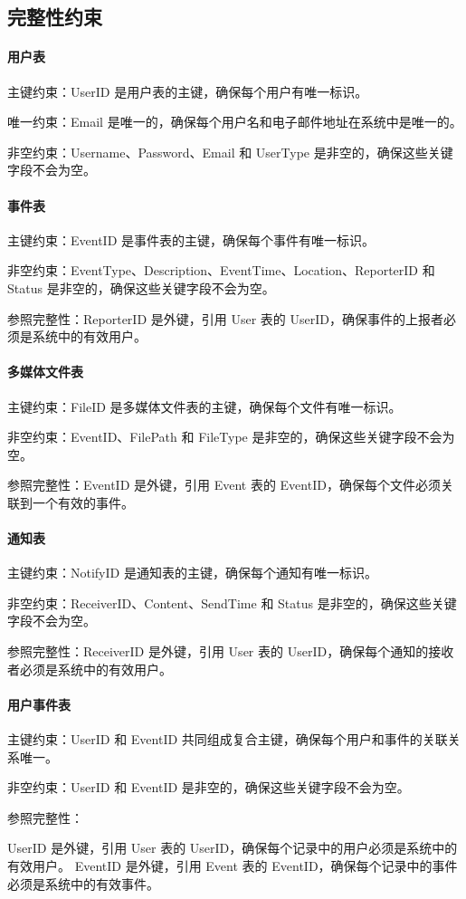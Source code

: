 \subsection{完整性约束}

\paragraph{用户表}

主键约束：UserID 是用户表的主键，确保每个用户有唯一标识。

唯一约束：Email 是唯一的，确保每个用户名和电子邮件地址在系统中是唯一的。

非空约束：Username、Password、Email 和 UserType 是非空的，确保这些关键字段不会为空。

\paragraph{事件表}

主键约束：EventID 是事件表的主键，确保每个事件有唯一标识。

非空约束：EventType、Description、EventTime、Location、ReporterID 和 Status 是非空的，确保这些关键字段不会为空。

参照完整性：ReporterID 是外键，引用 User 表的 UserID，确保事件的上报者必须是系统中的有效用户。

\paragraph{多媒体文件表}

主键约束：FileID 是多媒体文件表的主键，确保每个文件有唯一标识。

非空约束：EventID、FilePath 和 FileType 是非空的，确保这些关键字段不会为空。

参照完整性：EventID 是外键，引用 Event 表的 EventID，确保每个文件必须关联到一个有效的事件。

\paragraph{通知表}

主键约束：NotifyID 是通知表的主键，确保每个通知有唯一标识。

非空约束：ReceiverID、Content、SendTime 和 Status 是非空的，确保这些关键字段不会为空。

参照完整性：ReceiverID 是外键，引用 User 表的 UserID，确保每个通知的接收者必须是系统中的有效用户。

\paragraph{用户事件表}

主键约束：UserID 和 EventID 共同组成复合主键，确保每个用户和事件的关联关系唯一。

非空约束：UserID 和 EventID 是非空的，确保这些关键字段不会为空。

参照完整性：

UserID 是外键，引用 User 表的 UserID，确保每个记录中的用户必须是系统中的有效用户。
EventID 是外键，引用 Event 表的 EventID，确保每个记录中的事件必须是系统中的有效事件。
